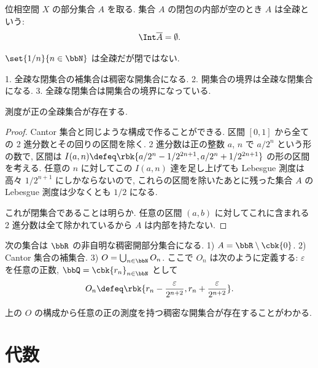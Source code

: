 \documentclass[openany, a4paper, oneside]{jsbook}
\begin{document}
\begin{defn}
位相空間 $X$ の部分集合 $A$ を取る.
集合 $A$ の閉包の内部が空のとき $A$ は全疎という:
\begin{align}
 \Int \overline{A}
 =
 \emptyset.
\end{align}
\end{defn}
\begin{ex}[閉集合でない全疎集合]
$\set{1/n}{n \in \bbN}$ は全疎だが閉ではない.
\end{ex}
\begin{prop}
1. 全疎な閉集合の補集合は稠密な開集合になる.
2. 開集合の境界は全疎な閉集合になる.
3. 全疎な閉集合は開集合の境界になっている.
\end{prop}
\begin{prop}[測度正の全疎集合]
測度が正の全疎集合が存在する.
\end{prop}
\begin{proof}
Cantor 集合と同じような構成で作ることができる.
区間 $[0, 1]$ から全ての 2 進分数とその回りの区間を除く.
2 進分数は正の整数 $a$, $n$ で $a/2^n$ という形の数で,
区間は $I(a, n) \defeq \rbk{a / 2^n - 1/ 2^{2n+1}, a / 2^n + 1 / 2^{2n+1}}$ の形の区間を考える.
任意の $n$ に対してこの $I(a,n)$ 達を足し上げても Lebesgue 測度は高々 $1 / 2^{n+1}$ にしかならないので,
これらの区間を除いたあとに残った集合 $A$ の Lebesgue 測度は少なくとも $1/2$ になる.

これが閉集合であることは明らか.
任意の区間 $(a, b)$ に対してこれに含まれる 2 進分数は全て除かれているから $A$ は内部を持たない.
\end{proof}

\begin{ex}
次の集合は $\bbR$ の非自明な稠密開部分集合になる.
1) $A = \bbR \setminus \cbk{0}$.
2) Cantor 集合の補集合.
3) $O = \bigcup_{n \in \bbN} O_n$. ここで $O_n$ は次のように定義する: $\varepsilon$ を任意の正数, $\bbQ = \cbk{r_n}_{n \in \bbN}$ として
   \begin{align}
    O_n
    \defeq
    \rbk{r_n - \frac{\varepsilon}{2^{n+2}}, r_n + \frac{\varepsilon}{2^{n+2}}}.
   \end{align}
\end{ex}
\begin{rem}\label{counterexamples-topological-spaces1}
上の $O$ の構成から任意の正の測度を持つ稠密な開集合が存在することがわかる.
\end{rem}
\chapter{代数}
\end{document}
